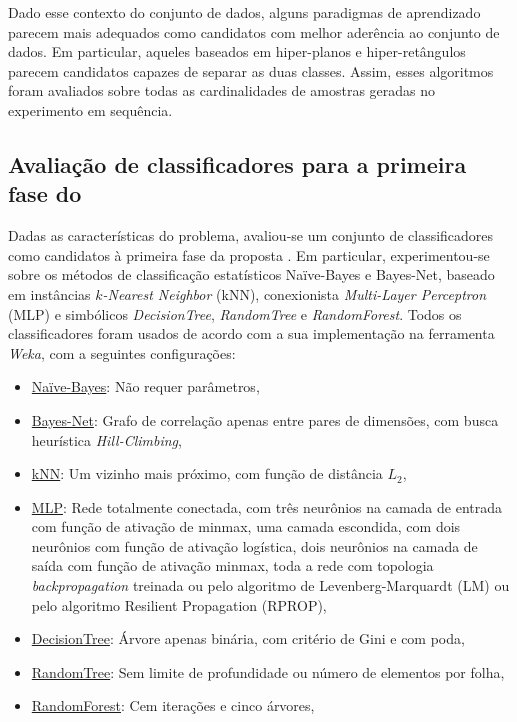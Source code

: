 Dado esse contexto do conjunto de dados, alguns paradigmas de aprendizado parecem mais adequados como candidatos com melhor aderência ao conjunto de dados.
Em particular, aqueles baseados em hiper-planos e hiper-retângulos parecem candidatos capazes de separar as duas classes.
Assim, esses algoritmos foram avaliados sobre todas as cardinalidades de amostras geradas no experimento em sequência.

\subsection{Avaliação de classificadores para a primeira fase do \system} \label{sec:exp_classificacao}

Dadas as características do problema, avaliou-se um conjunto de classificadores como candidatos à primeira fase da proposta \system.
Em particular, experimentou-se sobre os métodos de classificação estatísticos Na\"ive-Bayes e Bayes-Net, baseado em instâncias \textit{$k$-Nearest Neighbor} (kNN), conexionista \textit{Multi-Layer Perceptron} (MLP) e simbólicos \textit{DecisionTree}, \textit{RandomTree} e \textit{RandomForest}.
Todos os classificadores foram usados de acordo com a sua implementação na ferramenta \textit{Weka}, com a seguintes configurações:

\begin{itemize}
    \item \underline{Na\"ive-Bayes}: Não requer parâmetros,
    \item \underline{Bayes-Net}: Grafo de correlação apenas entre pares de dimensões, com busca heurística \textit{Hill-Climbing},
    \item \underline{kNN}: Um vizinho mais próximo, com função de distância $L_2$,
    \item \underline{MLP}: Rede totalmente conectada, com três neurônios na camada de entrada com função de ativação de minmax, uma camada escondida, com dois neurônios com função de ativação logística, dois neurônios na camada de saída com função de ativação minmax, toda a rede com topologia \textit{backpropagation} treinada ou pelo algoritmo de Levenberg-Marquardt (LM) ou pelo algoritmo Resilient Propagation (RPROP),
    \item \underline{DecisionTree}: Árvore apenas binária, com critério de Gini e com poda,
    \item \underline{RandomTree}: Sem limite de profundidade ou número de elementos por folha,
    \item \underline{RandomForest}: Cem iterações e cinco árvores,
\end{itemize}

